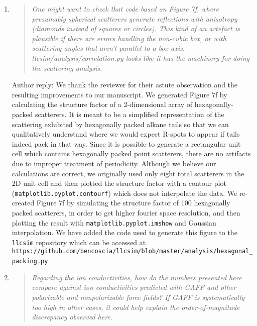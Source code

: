\documentclass{article}
\begin{document}
\begin{enumerate}
    \item \begin{quote}
    \textit{One might want to check that code based on Figure 7f, where
	    presumably spherical scatterers generate reflections with anisotropy (diamonds
	    instead of squares or circles). This kind of an artefact is plausible if there
	    are errors handling the non-cubic box, or with scattering angles that aren't
	    parallel to a box axis. llcsim/analysis/correlation.py looks like it has the
	    machinery for doing the scattering analysis.}
    \end{quote}
	
    Author reply: We thank the reviewer for their astute observation and
    the resulting improvements to our manuscript. We generated Figure 7f by
    calculating the structure factor of a 2-dimensional array of hexagonally-packed
    scatterers. It is meant to be a simplified representation of the scattering
    exhibited by hexagonally packed alkane tails so that we can qualitatively
    understand where we would expect R-spots to appear if tails indeed pack in that
    way. Since it is possible to generate a rectangular unit cell which contains
    hexagonally packed point scatterers, there are no artifacts due to improper
    treatment of periodicity.  Although we believe our calculations are correct, we
    originally used only eight total scatterers in the 2D unit cell and then
    plotted the structure factor with a contour plot
    (\texttt{matplotlib.pyplot.contourf}) which does not interpolate the data. We
    re-created Figure 7f by simulating the structure factor of 100 hexagonally
    packed scatterers, in order to get higher fourier space resolution, and then
    plotting the result with \texttt{matplotlib.pyplot.imshow} and Gaussian
    interpolation. We have added the code used to generate this figure to the
    \texttt{llcsim} repository which can be accessed at
    \texttt{https://github.com/bencoscia/llcsim/blob/master/analysis/hexagonal\_packing.py}.
	

    \item \begin{quote}	
    \textit{Regarding the ion conductivities, how do the numbers presented here
	    compare against ion conductivities predicted with GAFF and other polarizable
	    and nonpolarizable force fields? If GAFF is systematically too high in other
	    cases, it could help explain the order-of-magnitude discrepancy observed here.}
    \end{quote}


\end{enumerate}
\end{document}
